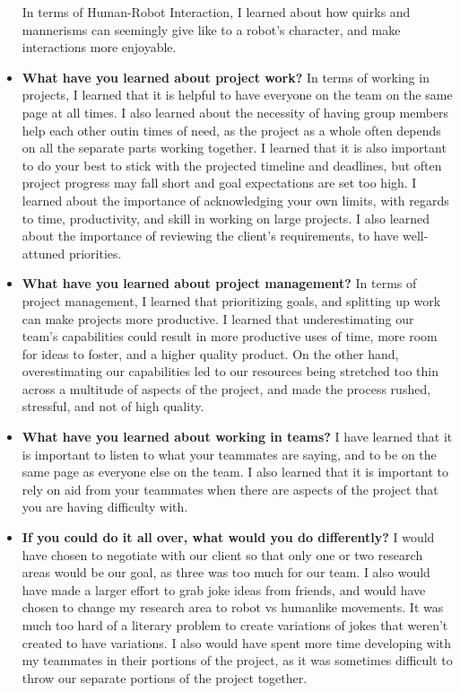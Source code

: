 \begin{itemize}
  In terms of Human-Robot Interaction, I learned about how quirks and mannerisms can seemingly give like to a robot's character, and make interactions more enjoyable.
\item{\textbf{What have you learned about project work?}}
  In terms of working in projects, I learned that it is helpful to have everyone on the team on the same page at all times. I also learned about the necessity of having group members help each other outin times of need, as the project as a whole often depends on all the separate parts working together. I learned that it is also important to do your best to stick with the projected timeline and deadlines, but often project progress may fall short and goal expectations are set too high. I learned about the importance of acknowledging your own limits, with regards to time, productivity, and skill in working on large projects. I also learned about the importance of reviewing the client's requirements, to have well-attuned priorities.
\item{\textbf{What have you learned about project management?}}
  In terms of project management, I learned that prioritizing goals, and splitting up work can make projects more productive. I learned that underestimating our team's capabilities could result in more productive uses of time, more room for ideas to foster, and a higher quality product. On the other hand, overestimating our capabilities led to our resources being stretched too thin across a multitude of aspects of the project, and made the process rushed, stressful, and not of high quality.

\item{\textbf{What have you learned about working in teams?}}
  I have learned that it is important to listen to what your teammates are saying, and to be on the same page as everyone else on the team. I also learned that it is important to rely on aid from your teammates when there are aspects of the project that you are having difficulty with.

\item{\textbf{If you could do it all over, what would you do differently?}}
  I would have chosen to negotiate with our client so that only one or two research areas would be our goal, as three was too much for our team. I also would have made a larger effort to grab joke ideas from friends, and would have chosen to change my research area to robot vs humanlike movements. It was much too hard of a literary problem to create variations of jokes that weren't created to have variations. I also would have spent more time developing with my teammates in their portions of the project, as it was sometimes difficult to throw our separate portions of the project together.


\end{itemize}
